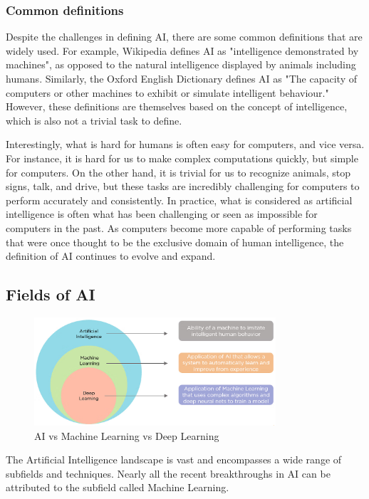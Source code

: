 \documentclass{article}
\begin{document}
\subsubsection{Common definitions}

Despite the challenges in defining AI, there are some common definitions
that are widely used. For example, Wikipedia defines AI as "intelligence
demonstrated by machines", as opposed to the natural intelligence displayed
by animals including humans. Similarly, the Oxford English Dictionary
defines AI as "The capacity of computers or other machines to exhibit or
simulate intelligent behaviour." However, these definitions are themselves
based on the concept of intelligence, which is also not a trivial task to
define.

Interestingly, what is hard for humans is often easy for computers, and vice
versa. For instance, it is hard for us to make complex computations quickly,
but simple for computers. On the other hand, it is trivial for us to recognize
animals, stop signs, talk, and drive, but these tasks are incredibly
challenging for computers to perform accurately and consistently. In practice,
what is considered as artificial intelligence is often what has been
challenging or seen as impossible for computers in the past. As computers
become more capable of performing tasks that were once thought to be the
exclusive domain of human intelligence, the definition of AI continues
to evolve and expand.

\subsection{Fields of AI}

\begin{figure}[h] %
    \centering
    \includegraphics[width=0.8\textwidth]{images/AI_ML_DL.png}
    \caption{AI vs Machine Learning vs Deep Learning \cite{simplilearn_ai_ml_dl}}
\end{figure}


The Artificial Intelligence landscape is vast and encompasses a wide range
of subfields and techniques. Nearly all the recent breakthroughs in AI
can be attributed to the subfield called Machine Learning.
\end{document}
